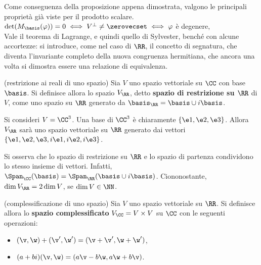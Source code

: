\documentclass[11pt]{article}
\begin{document}
	\begin{remark}
		Come conseguenza della proposizione appena dimostrata, valgono
		le principali proprietà già viste per il prodotto scalare. \\
		
		\li $\det(M_\basis(\varphi)) = 0 \iff V^\perp \neq \zerovecset \iff \varphi$ è degenere, \\
		\li Vale il teorema di Lagrange, e quindi quello di Sylvester, benché con alcune accortezze: si
		introduce, come nel caso di $\RR$, il concetto di segnatura, che diventa l'invariante completo
		della nuova congruenza hermitiana, che ancora una volta si dimostra essere una relazione
		di equivalenza.
	\end{remark}

	\hr

	\begin{definition} (restrizione ai reali di uno spazio) Sia $V$
		uno spazio vettoriale su $\CC$ con base $\basis$. Si definisce allora lo spazio $V_\RR$, detto
		\textbf{spazio di restrizione su $\RR$} di $V$, come uno spazio su $\RR$ generato da
		$\basis_\RR = \basis \cup i \basis$. 
	\end{definition}

	\begin{example}
		Si consideri $V = \CC^3$. Una base di $\CC^3$ è chiaramente $\{ \e1, \e2, \e3 \}$. Allora
		$V_\RR$ sarà uno spazio vettoriale su $\RR$ generato dai vettori $\{ \e1, \e2, \e3, i\e1, i\e2, i\e3 \}$.
	\end{example}

	\begin{remark}
		Si osserva che lo spazio di restrizione su $\RR$ e lo spazio di partenza condividono lo stesso insieme
		di vettori. Infatti, $\Span_\CC(\basis) = \Span_\RR(\basis \cup i\basis)$. Ciononostante, $\dim V_\RR = 2 \dim V$, se $\dim V \in \NN$.
	\end{remark}

	\begin{definition} (complessificazione di uno spazio) Sia $V$ uno spazio vettoriale su $\RR$.
		Si definisce allora lo \textbf{spazio complessificato} $V_\CC = V \times V$ su $\CC$ con le seguenti operazioni:
		
		\begin{itemize}
			\item $(\v, \w) + (\v', \w') = (\v + \v', \w + \w')$,
			\item $(a+bi)(\v, \w) = (a\v - b\w, a\w + b\v)$.
		\end{itemize}
	\end{definition}
\end{document}
